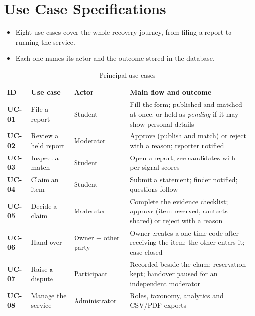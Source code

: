 \documentclass[12pt,a4paper,oneside]{report}
\begin{document}
\section{Use Case Specifications}
\begin{itemize}
  \item Eight use cases cover the whole recovery journey, from filing a report to running the service.
  \item Each one names its actor and the outcome stored in the database.
\end{itemize}
\begin{table}[H]
\centering\small
\caption{Principal use cases}
\begin{tabularx}{\textwidth}{>{\bfseries}P{10mm}P{29mm}P{25mm}X}
\toprule
ID & Use case & Actor & Main flow and outcome\\
\midrule
UC-01 & File a report & Student & Fill the form; published and matched at once, or held as \emph{pending} if it may show personal details\\
UC-02 & Review a held report & Moderator & Approve (publish and match) or reject with a reason; reporter notified\\
UC-03 & Inspect a match & Student & Open a report; see candidates with per-signal scores\\
UC-04 & Claim an item & Student & Submit a statement; finder notified; questions follow\\
UC-05 & Decide a claim & Moderator & Complete the evidence checklist; approve (item reserved, contacts shared) or reject with a reason\\
UC-06 & Hand over & Owner + other party & Owner creates a one-time code after receiving the item; the other enters it; case closed\\
UC-07 & Raise a dispute & Participant & Recorded beside the claim; reservation kept; handover paused for an independent moderator\\
UC-08 & Manage the service & Administrator & Roles, taxonomy, analytics and CSV/PDF exports\\
\bottomrule
\end{tabularx}
\end{table}
\end{document}
